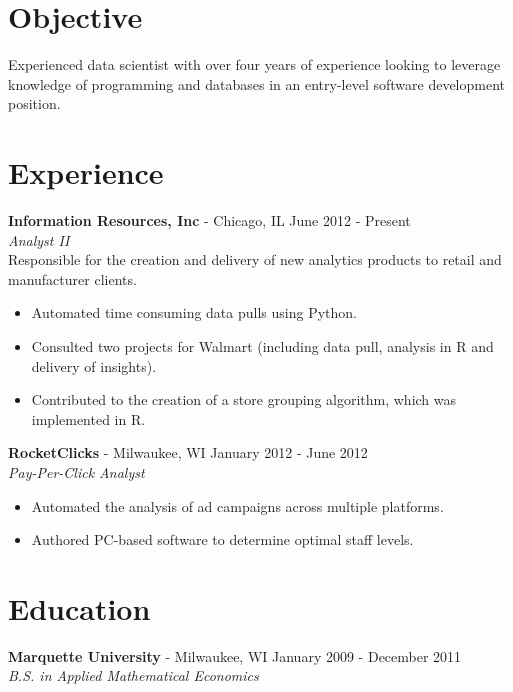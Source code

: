 \documentclass[margin]{res}
\begin{document}
\address{Chicago, IL 60640\\  (847) 909-6486}
\address{www.rhostats.com\\ mrhodes262@gmail.com}


\begin{resume}

\section{Objective} Experienced data scientist with over four years of experience looking to leverage knowledge of programming and databases in an entry-level software development position.

\section{Experience}
 {\bf Information Resources, Inc} - Chicago, IL \hfill June 2012 - Present\\
 \textit{Analyst II}\\
 {Responsible for the creation and delivery of new analytics products to retail and manufacturer clients.}
 
 \begin{itemize} \itemsep -2pt  %
	\item Automated time consuming data pulls using Python.
 	\item Consulted two projects for Walmart (including data pull, analysis in R and delivery of insights).
 	\item Contributed to the creation of a store grouping algorithm, which was implemented in R.
 \end{itemize}
 
 {\bf RocketClicks} - Milwaukee, WI \hfill January 2012 - June 2012\\
 \textit{Pay-Per-Click Analyst}
 \begin{itemize} \itemsep -2pt  %
 	\item Automated the analysis of ad campaigns across multiple platforms.
 	\item Authored PC-based software to determine optimal staff levels.
 \end{itemize}
 
\section{Education} 
\textbf{Marquette University} - Milwaukee, WI \hfill January 2009 - December 2011 \\
\textit{B.S. in Applied Mathematical Economics}


\end{resume}
\end{document}
